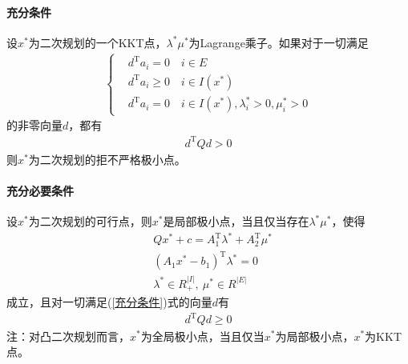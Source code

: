         \paragraph{充分条件}
        设$x^*$为二次规划的一个KKT点，${\lambda}^*{\mu}^*$为Lagrange乘子。如果对于一切满足
        \begin{align}
          \label{充分条件}
          \left\{
            \begin{aligned}
                &d^\mathrm{T} a_i = 0 \quad i\in E\\
                &d^\mathrm{T} a_i \geqslant 0 \quad i\in I(x^*)\\
                &{d}^\mathrm{T} a_i = 0 \quad i\in I(x^*),{\lambda}^*_i>0,{\mu}^*_i>0
            \end{aligned}
          \right.
        \end{align}
        的非零向量$d$，都有
        \begin{align*}
        d^\mathrm{T} Qd>0
        \end{align*}
        则$x^*$为二次规划的拒不严格极小点。
        \paragraph{充分必要条件}
        设$x^*$为二次规划的可行点，则$x^*$是局部极小点，当且仅当存在${\lambda}^*{\mu}^*$，使得
        \begin{align*}
                &Qx^*+c = A_1^\mathrm{T} {\lambda}^*+A_2^\mathrm{T} {\mu}^*\\
                &(A_1x^*-b_1)^\mathrm{T} {\lambda}^*=0\\
                &{\lambda}^* \in R^{|I|}_{+},\ {\mu}^* \in R^{|E|}
        \end{align*}
        成立，且对一切满足(\ref{充分条件})式的向量$d$有
        \begin{align*}
        d^\mathrm{T} Qd \geqslant 0
        \end{align*}
        注：对凸二次规划而言，$x^*$为全局极小点，当且仅当$x^*$为局部极小点，$x^*$为KKT点。
